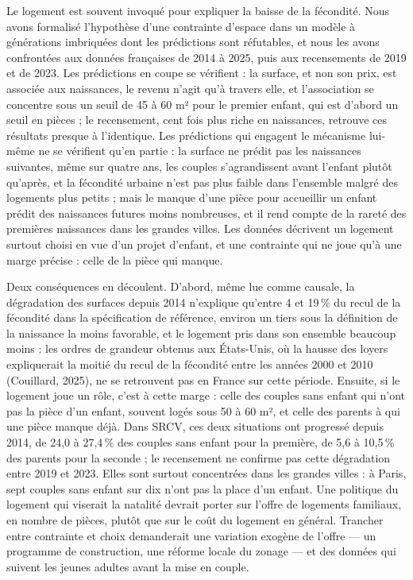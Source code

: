 \documentclass[11pt,a4paper]{article}
\theoremstyle{plain}
\theoremstyle{definition}
\theoremstyle{remark}
\begin{document}
Le logement est souvent invoqué pour expliquer la baisse de la fécondité. Nous avons formalisé l'hypothèse d'une contrainte d'espace dans un modèle à générations imbriquées dont les prédictions sont réfutables, et nous les avons confrontées aux données françaises de 2014 à 2025, puis aux recensements de 2019 et de 2023. Les prédictions en coupe se vérifient : la surface, et non son prix, est associée aux naissances, le revenu n'agit qu'à travers elle, et l'association se concentre sous un seuil de 45 à 60 m² pour le premier enfant, qui est d'abord un seuil en pièces ; le recensement, cent fois plus riche en naissances, retrouve ces résultats presque à l'identique. Les prédictions qui engagent le mécanisme lui-même ne se vérifient qu'en partie : la surface ne prédit pas les naissances suivantes, même sur quatre ans, les couples s'agrandissent avant l'enfant plutôt qu'après, et la fécondité urbaine n'est pas plus faible dans l'ensemble malgré des logements plus petits ; mais le manque d'une pièce pour accueillir un enfant prédit des naissances futures moins nombreuses, et il rend compte de la rareté des premières naissances dans les grandes villes. Les données décrivent un logement surtout choisi en vue d'un projet d'enfant, et une contrainte qui ne joue qu'à une marge précise : celle de la pièce qui manque.

Deux conséquences en découlent. D'abord, même lue comme causale, la dégradation des surfaces depuis 2014 n'explique qu'entre 4 et 19\,\% du recul de la fécondité dans la spécification de référence, environ un tiers sous la définition de la naissance la moins favorable, et le logement pris dans son ensemble beaucoup moins : les ordres de grandeur obtenus aux États-Unis, où la hausse des loyers expliquerait la moitié du recul de la fécondité entre les années 2000 et 2010 (Couillard, 2025), ne se retrouvent pas en France sur cette période. Ensuite, si le logement joue un rôle, c'est à cette marge : celle des couples sans enfant qui n'ont pas la pièce d'un enfant, souvent logés sous 50 à 60 m², et celle des parents à qui une pièce manque déjà. Dans SRCV, ces deux situations ont progressé depuis 2014, de 24,0 à 27,4\,\% des couples sans enfant pour la première, de 5,6 à 10,5\,\% des parents pour la seconde ; le recensement ne confirme pas cette dégradation entre 2019 et 2023. Elles sont surtout concentrées dans les grandes villes : à Paris, sept couples sans enfant sur dix n'ont pas la place d'un enfant. Une politique du logement qui viserait la natalité devrait porter sur l'offre de logements familiaux, en nombre de pièces, plutôt que sur le coût du logement en général. Trancher entre contrainte et choix demanderait une variation exogène de l'offre — un programme de construction, une réforme locale du zonage — et des données qui suivent les jeunes adultes avant la mise en couple.
\end{document}
